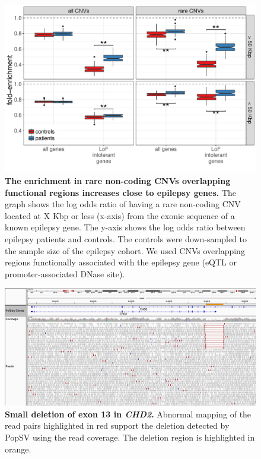 \begin{figure}[ht]
  \includegraphics[width=\linewidth, page=9]{figures/epilepsy-enrichmentPatterns.pdf}
  \caption[The enrichment in rare non-coding CNVs overlapping functional regions increases close to epilepsy genes.]{{\bf The enrichment in rare non-coding CNVs overlapping functional regions increases close to epilepsy genes.} {\small The graph shows the log odds ratio of having a rare non-coding CNV located at X Kbp or less (x-axis) from the exonic sequence of a known epilepsy gene. The y-axis shows the log odds ratio between epilepsy patients and controls. The controls were down-sampled to the sample size of the epilepsy cohort. We used CNVs overlapping regions functionally associated with the epilepsy gene (eQTL or promoter-associated DNase site).}}
  \label{fig:epidistncfunOR}
\end{figure}

\begin{figure}[htp]
  \centering
  \includegraphics[width=\linewidth]{figures/CHD2-deletedExon.png}
  \caption[Small deletion of exon 13 in {\it CHD2}.]{{\bf Small deletion of exon 13 in {\it CHD2}.} {\small Abnormal mapping of the read pairs highlighted in red support the deletion detected by {\sf PopSV} using the read coverage. The deletion region is highlighted in orange.}}
  \label{fig:chd213}
\end{figure}

